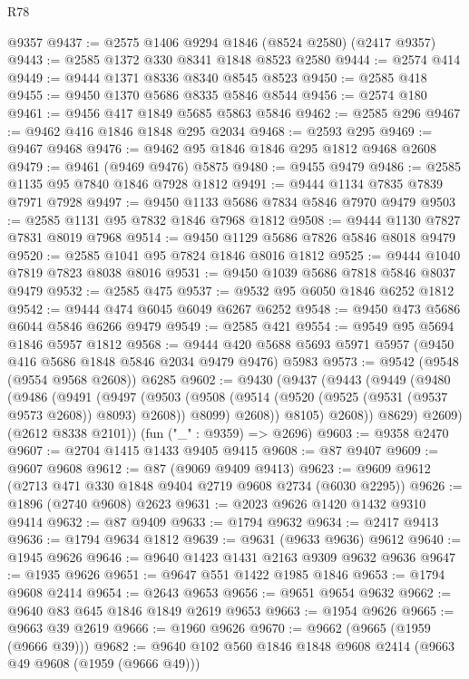 \begin{lexlean}{R78}
\begin{coremodule}
    @9357
@9437 := @2575 @1406 @9294 @1846 (@8524 @2580) (@2417 @9357)
@9443 := @2585 @1372 @330 @8341 @1848 @8523 @2580
@9444 := @2574 @414
@9449 := @9444 @1371 @8336 @8340 @8545 @8523
@9450 := @2585 @418
@9455 := @9450 @1370 @5686 @8335 @5846 @8544
@9456 := @2574 @180
@9461 := @9456 @417 @1849 @5685 @5863 @5846
@9462 := @2585 @296
@9467 := @9462 @416 @1846 @1848 @295 @2034
@9468 := @2593 @295
@9469 := @9467 @9468
@9476 := @9462 @95 @1846 @1846 @295 @1812 @9468 @2608
@9479 := @9461 (@9469 @9476) @5875
@9480 := @9455 @9479
@9486 := @2585 @1135 @95 @7840 @1846 @7928 @1812
@9491 := @9444 @1134 @7835 @7839 @7971 @7928
@9497 := @9450 @1133 @5686 @7834 @5846 @7970 @9479
@9503 := @2585 @1131 @95 @7832 @1846 @7968 @1812
@9508 := @9444 @1130 @7827 @7831 @8019 @7968
@9514 := @9450 @1129 @5686 @7826 @5846 @8018 @9479
@9520 := @2585 @1041 @95 @7824 @1846 @8016 @1812
@9525 := @9444 @1040 @7819 @7823 @8038 @8016
@9531 := @9450 @1039 @5686 @7818 @5846 @8037 @9479
@9532 := @2585 @475
@9537 := @9532 @95 @6050 @1846 @6252 @1812
@9542 := @9444 @474 @6045 @6049 @6267 @6252
@9548 := @9450 @473 @5686 @6044 @5846 @6266 @9479
@9549 := @2585 @421
@9554 := @9549 @95 @5694 @1846 @5957 @1812
@9568 := @9444 @420 @5688 @5693 @5971 @5957 (@9450 @416 @5686 @1848 @5846 @2034 @9479 @9476) @5983
@9573 := @9542 (@9548 (@9554 @9568 @2608)) @6285
@9602 := @9430
    (@9437
      (@9443
        (@9449
          (@9480
            (@9486
              (@9491
                (@9497
                  (@9503
                    (@9508 (@9514 (@9520 (@9525 (@9531 (@9537 @9573 @2608)) @8093) @2608)) @8099)
                    @2608))
                @8105)
              @2608))
          @8629)
        @2609)
      (@2612 @8338 @2101))
    (fun ("_" : @9359) => @2696)
@9603 := @9358 @2470
@9607 := @2704 @1415 @1433 @9405 @9415
@9608 := @87 @9407
@9609 := @9607 @9608
@9612 := @87 (@9069 @9409 @9413)
@9623 := @9609 @9612 (@2713 @471 @330 @1848 @9404 @2719 @9608 @2734 (@6030 @2295))
@9626 := @1896 (@2740 @9608) @2623
@9631 := @2023 @9626 @1420 @1432 @9310 @9414
@9632 := @87 @9409
@9633 := @1794 @9632
@9634 := @2417 @9413
@9636 := @1794 @9634 @1812
@9639 := @9631 (@9633 @9636) @9612
@9640 := @1945 @9626
@9646 := @9640 @1423 @1431 @2163 @9309 @9632 @9636
@9647 := @1935 @9626
@9651 := @9647 @551 @1422 @1985 @1846
@9653 := @1794 @9608 @2414
@9654 := @2643 @9653
@9656 := @9651 @9654 @9632
@9662 := @9640 @83 @645 @1846 @1849 @2619 @9653
@9663 := @1954 @9626
@9665 := @9663 @39 @2619
@9666 := @1960 @9626
@9670 := @9662 (@9665 (@1959 (@9666 @39)))
@9682 := @9640 @102 @560 @1846 @1848 @9608 @2414 (@9663 @49 @9608 (@1959 (@9666 @49)))

\end{coremodule}
\end{lexlean}
